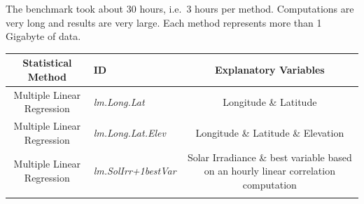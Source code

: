 \documentclass[12pt,twoside]{reedthesis}
\theoremstyle{definition}
\theoremstyle{definition}
\theoremstyle{definition}
\theoremstyle{remark}
\begin{document}
The benchmark took about 30 hours, i.e.~3 hours per method. Computations
are very long and results are very large. Each method represents more
than 1 Gigabyte of data.
\begin{longtable}[]{@{}clc@{}}
\toprule
\begin{minipage}[b]{0.18\columnwidth}\centering\strut
Statistical Method\strut
\end{minipage} & \begin{minipage}[b]{0.21\columnwidth}\raggedright\strut
ID\strut
\end{minipage} & \begin{minipage}[b]{0.52\columnwidth}\centering\strut
Explanatory Variables\strut
\end{minipage}\tabularnewline
\midrule
\endhead
\begin{minipage}[t]{0.18\columnwidth}\centering\strut
Multiple Linear Regression\strut
\end{minipage} & \begin{minipage}[t]{0.21\columnwidth}\raggedright\strut
\emph{lm.Long.Lat}\strut
\end{minipage} & \begin{minipage}[t]{0.52\columnwidth}\centering\strut
Longitude \& Latitude\strut
\end{minipage}\tabularnewline
\begin{minipage}[t]{0.18\columnwidth}\centering\strut
Multiple Linear Regression\strut
\end{minipage} & \begin{minipage}[t]{0.21\columnwidth}\raggedright\strut
\emph{lm.Long.Lat.Elev}\strut
\end{minipage} & \begin{minipage}[t]{0.52\columnwidth}\centering\strut
Longitude \& Latitude \& Elevation\strut
\end{minipage}\tabularnewline
\begin{minipage}[t]{0.18\columnwidth}\centering\strut
Multiple Linear Regression\strut
\end{minipage} & \begin{minipage}[t]{0.21\columnwidth}\raggedright\strut
\emph{lm.SolIrr+1bestVar}\strut
\end{minipage} & \begin{minipage}[t]{0.52\columnwidth}\centering\strut
Solar Irradiance \& best variable based on an hourly linear correlation
computation\strut
\end{minipage}\tabularnewline
\begin{minipage}[t]{0.18\columnwidth}\centering\strut

\end{minipage}
\end{longtable}
\end{document}
